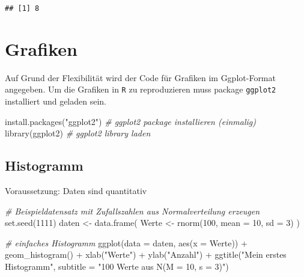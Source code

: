 \documentclass[
]{book}
\newenvironment{Shaded}{\begin{snugshade}}{\end{snugshade}}
\newcommand{\AttributeTok}[1]{\textcolor[rgb]{0.77,0.63,0.00}{#1}}
\newcommand{\CommentTok}[1]{\textcolor[rgb]{0.56,0.35,0.01}{\textit{#1}}}
\newcommand{\DecValTok}[1]{\textcolor[rgb]{0.00,0.00,0.81}{#1}}
\newcommand{\FunctionTok}[1]{\textcolor[rgb]{0.00,0.00,0.00}{#1}}
\newcommand{\NormalTok}[1]{#1}
\newcommand{\OtherTok}[1]{\textcolor[rgb]{0.56,0.35,0.01}{#1}}
\newcommand{\SpecialCharTok}[1]{\textcolor[rgb]{0.00,0.00,0.00}{#1}}
\newcommand{\StringTok}[1]{\textcolor[rgb]{0.31,0.60,0.02}{#1}}
\begin{document}
\begin{verbatim}
## [1] 8
\end{verbatim}

\hypertarget{grafiken}{%
\section{Grafiken}\label{grafiken}}

Auf Grund der Flexibilität wird der Code für Grafiken im Ggplot-Format \citep{R-ggplot2} angegeben. Um die Grafiken in \texttt{R} zu reproduzieren muss package \texttt{ggplot2} installiert und geladen sein.

\begin{Shaded}
\begin{Highlighting}[]
\FunctionTok{install.packages}\NormalTok{(}\StringTok{"ggplot2"}\NormalTok{)       }\CommentTok{\# ggplot2 package installieren (einmalig)}
\FunctionTok{library}\NormalTok{(ggplot2)                  }\CommentTok{\# ggplot2 library laden}
\end{Highlighting}
\end{Shaded}

\hypertarget{histogramm}{%
\subsection{Histogramm}\label{histogramm}}

Voraussetzung: Daten sind quantitativ

\begin{Shaded}
\begin{Highlighting}[]
\CommentTok{\# Beispieldatensatz mit Zufallszahlen aus Normalverteilung erzeugen}
\FunctionTok{set.seed}\NormalTok{(}\DecValTok{1111}\NormalTok{)}
\NormalTok{daten }\OtherTok{\textless{}{-}} \FunctionTok{data.frame}\NormalTok{(}
\NormalTok{  Werte }\OtherTok{\textless{}{-}} \FunctionTok{rnorm}\NormalTok{(}\DecValTok{100}\NormalTok{, }\AttributeTok{mean =} \DecValTok{10}\NormalTok{, }\AttributeTok{sd =} \DecValTok{3}\NormalTok{) }
\NormalTok{)}

\CommentTok{\# einfaches Histogramm}
\FunctionTok{ggplot}\NormalTok{(}\AttributeTok{data =}\NormalTok{ daten, }\FunctionTok{aes}\NormalTok{(}\AttributeTok{x =}\NormalTok{ Werte)) }\SpecialCharTok{+}
  \FunctionTok{geom\_histogram}\NormalTok{() }\SpecialCharTok{+}
  \FunctionTok{xlab}\NormalTok{(}\StringTok{"Werte"}\NormalTok{) }\SpecialCharTok{+}
  \FunctionTok{ylab}\NormalTok{(}\StringTok{"Anzahl"}\NormalTok{) }\SpecialCharTok{+}
  \FunctionTok{ggtitle}\NormalTok{(}\StringTok{"Mein erstes Histogramm"}\NormalTok{, }\AttributeTok{subtitle =} \StringTok{"100 Werte aus N(M = 10, s = 3)"}\NormalTok{)  }
\end{Highlighting}
\end{Shaded}
\end{document}
